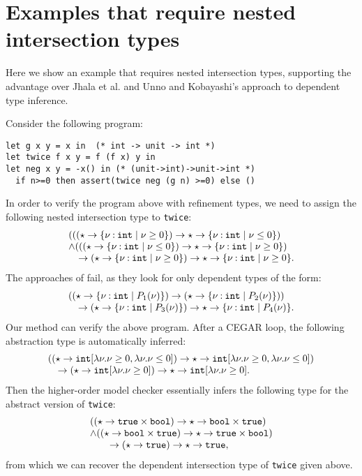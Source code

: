 \section{Examples that require nested intersection types}
\label{sec:intersection}

Here we show an example that requires nested intersection types,
supporting the advantage over Jhala et al. and Unno and Kobayashi's approach
to dependent type inference.

Consider the following program:
\begin{verbatim}
let g x y = x in  (* int -> unit -> int *)
let twice f x y = f (f x) y in
let neg x y = -x() in (* (unit->int)->unit->int *)
  if n>=0 then assert(twice neg (g n) >=0) else ()
\end{verbatim}
In order to verify the program above with refinement types, 
we need to assign the following nested intersection type to \texttt{twice}:
\[\begin{array}{l}
 (((\star\rightarrow \{\nu\mathbin{:} \texttt{int}\mid \nu\geq 0\})\rightarrow \star\rightarrow \{\nu\mathbin{:} \texttt{int}\mid \nu\leq 0\})\\
\land 
 (((\star\rightarrow \{\nu\mathbin{:} \texttt{int}\mid \nu\leq 0\})\rightarrow \star\rightarrow \{\nu\mathbin{:} \texttt{int}\mid \nu\geq 0\})\\
\quad
   \rightarrow (\star\rightarrow \{\nu\mathbin{:} \texttt{int}\mid \nu\geq 0\}) \rightarrow \star\rightarrow \{\nu\mathbin{:} \texttt{int}\mid \nu\geq 0\}.
\end{array}
\]
The approaches of  \cite{Rondon2008,Unno2009} fail, as they look for only dependent types of the form:%
\[\begin{array}{l}
( (\star\rightarrow \{\nu\mathbin{:} \texttt{int}\mid P_1(\nu)\})\rightarrow (\star\rightarrow \{\nu\mathbin{:} \texttt{int}\mid P_2(\nu)\}))\\
\quad
   \rightarrow (\star\rightarrow \{\nu\mathbin{:} \texttt{int}\mid P_3(\nu)\}) \rightarrow 
   \star\rightarrow \{\nu\mathbin{:} \texttt{int}\mid P_4(\nu)\}.
\end{array}
\]
Our method can verify the above program.
After a CEGAR loop, the following abstraction type is automatically inferred:
\[
\begin{array}{l}
((\star\rightarrow \mathtt{int}[\lambda \nu.\nu\geq 0, \lambda \nu.\nu\leq 0]) 
\rightarrow 
 \star\rightarrow \mathtt{int}[\lambda \nu.\nu\geq 0, \lambda \nu.\nu\leq 0])\\
\quad \rightarrow (\star\rightarrow \mathtt{int}[\lambda \nu.\nu\geq 0]) \rightarrow  \star\rightarrow \mathtt{int}[\lambda \nu.\nu\geq 0].
\end{array}
\]
Then the higher-order model checker essentially infers the following type for the abstract version of \texttt{twice}:
\[
\begin{array}{l}
((\star\rightarrow \mathtt{true}\times \mathtt{bool}) \rightarrow \star\rightarrow \mathtt{bool}\times \mathtt{true})\\
\land ((\star\rightarrow \mathtt{bool}\times \mathtt{true}) \rightarrow \star\rightarrow \mathtt{true}\times \mathtt{bool})\\
\qquad \rightarrow (\star\rightarrow \mathtt{true}) \rightarrow \star\rightarrow \mathtt{true},
\end{array}
\]
from which we can recover the dependent intersection type of \texttt{twice} given above.
